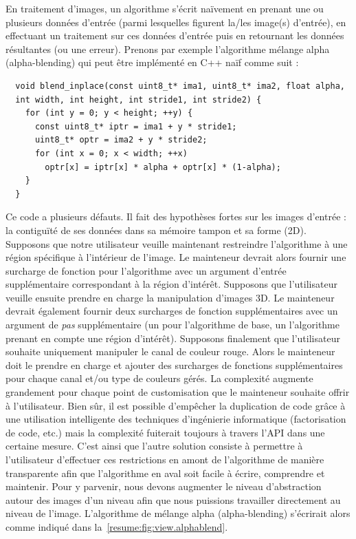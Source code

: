 En traitement d'images, un algorithme s'écrit naïvement en prenant une ou plusieurs données d'entrée (parmi lesquelles
figurent la/les image(s) d'entrée), en effectuant un traitement sur ces données d'entrée puis en retournant les données
résultantes (ou une erreur). Prenons par exemple l'algorithme mélange alpha (alpha-blending) qui peut être implémenté en
C++ naïf comme suit :
\begin{verbatim}
  void blend_inplace(const uint8_t* ima1, uint8_t* ima2, float alpha,
  int width, int height, int stride1, int stride2) {
    for (int y = 0; y < height; ++y) {
      const uint8_t* iptr = ima1 + y * stride1;
      uint8_t* optr = ima2 + y * stride2;
      for (int x = 0; x < width; ++x)
        optr[x] = iptr[x] * alpha + optr[x] * (1-alpha);
    }
  }
\end{verbatim}

Ce code a plusieurs défauts. Il fait des hypothèses fortes sur les images d'entrée : la contiguïté de ses données dans
sa mémoire tampon et sa forme (2D). Supposons que notre utilisateur veuille maintenant restreindre l'algorithme à une
région spécifique à l'intérieur de l'image. Le mainteneur devrait alors fournir une surcharge de fonction pour
l'algorithme avec un argument d'entrée supplémentaire correspondant à la région d'intérêt. Supposons que l'utilisateur
veuille ensuite prendre en charge la manipulation d'images 3D. Le mainteneur devrait également fournir deux surcharges
de fonction supplémentaires avec un argument de \emph{pas} supplémentaire (un pour l'algorithme de base, un l'algorithme
prenant en compte une région d'intérêt). Supposons finalement que l'utilisateur souhaite uniquement manipuler le canal
de couleur rouge. Alors le mainteneur doit le prendre en charge et ajouter des surcharges de fonctions supplémentaires
pour chaque canal et/ou type de couleurs gérés. La complexité augmente grandement pour chaque point de customisation que
le mainteneur souhaite offrir à l'utilisateur. Bien sûr, il est possible d'empêcher la duplication de code grâce à une
utilisation intelligente des techniques d'ingénierie informatique (factorisation de code, etc.) mais la complexité
fuiterait toujours à travers l'API dans une certaine mesure. C'est ainsi que l'autre solution consiste à permettre à
l'utilisateur d'effectuer ces restrictions en amont de l'algorithme de manière transparente afin que l'algorithme en
aval soit facile à écrire, comprendre et maintenir. Pour y parvenir, nous devons augmenter le niveau d'abstraction
autour des images d'un niveau afin que nous puissions travailler directement au niveau de l'image. L'algorithme de
mélange alpha (alpha-blending) s'écrirait alors comme indiqué dans la~\cref{resume:fig:view.alphablend}.

